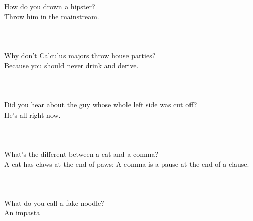 
\usepackage{blindtext}



How do you drown a hipster?\\
Throw him in the mainstream.\\\\

\blindtext
\blindtext \\\\



Why don’t Calculus majors throw house parties?\\
Because you should never drink and derive. \\\\


\blindtext
\blindtext\\\\

Did you hear about the guy whose whole left side was cut off?\\
 He's all right now.\\\\

\blindtext
\blindtext\\\\

What’s the different between a cat and a comma?\\
A cat has claws at the end of paws; A comma is a pause at the end of a clause.\\\\

\blindtext
\blindtext\\\\

What do you call a fake noodle?\\
An impasta\\\\

